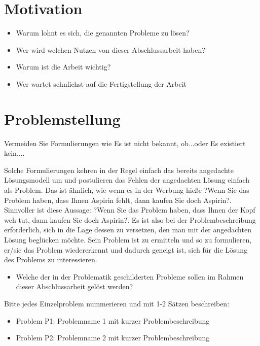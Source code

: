 \documentclass[headsepline,titlepage,twoside,12pt]{report}
\begin{document}
\section{Motivation}

\begin{itemize}

\item Warum lohnt es sich, die genannten Probleme zu lösen?
\item Wer wird welchen Nutzen von dieser Abschlussarbeit haben?
\item Warum ist die Arbeit wichtig?
\item Wer wartet sehnlichst auf die Fertigstellung der Arbeit

\end{itemize}

\section{Problemstellung}

Vermeiden Sie Formulierungen wie \glqq Es ist nicht bekannt, ob...\grqq oder \glqq Es existiert kein...\grqq.

Solche Formulierungen kehren in der Regel einfach das bereits angedachte Lösungsmodell um und postulieren das Fehlen der angedachten Lösung einfach als Problem. Das ist ähnlich, wie wenn es  in der Werbung hieße ?Wenn Sie das Problem haben, dass Ihnen Aspirin fehlt, dann kaufen Sie doch Aspirin?. Sinnvoller ist diese Aussage:  ?Wenn Sie das Problem haben, dass Ihnen der Kopf weh tut, dann kaufen Sie doch Aspirin?. Es ist also bei der Problembeschreibung erforderlich, sich in die Lage dessen zu versetzen, den man mit der angedachten Lösung beglücken möchte. Sein Problem ist zu ermitteln und so zu formulieren, er/sie das Problem wiedererkennt und dadurch geneigt ist, sich für die Lösung des Problems zu interessieren.

\begin{itemize}

\item Welche der in der Problematik geschilderten Probleme sollen im Rahmen dieser Abschlussarbeit gelöst werden?
\end{itemize}
Bitte jedes Einzelproblem nummerieren und mit 1-2 Sätzen beschreiben:

\begin{itemize}


\item Problem P1: Problemname 1 mit kurzer Problembeschreibung
\item Problem P2: Problemname 2 mit kurzer Problembeschreibung
\end{itemize}
\end{document}
